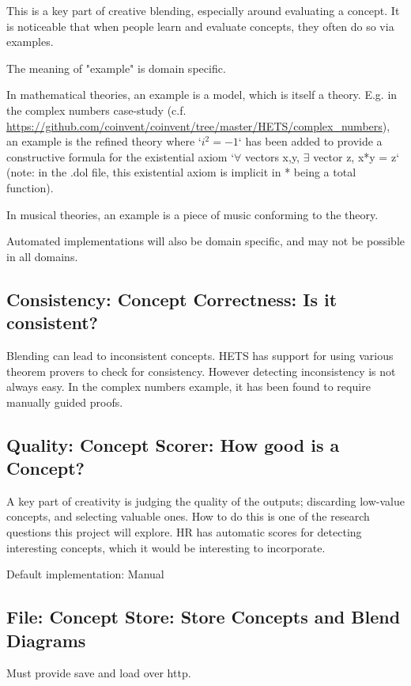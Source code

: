 \documentclass[10pt]{article}
\begin{document}
This is a key part of creative blending, especially around evaluating a concept. 
It is noticeable that when people learn and evaluate concepts, they often do so via examples.

The meaning of "example" is domain specific.

In mathematical theories, an example is a model, which is itself a theory. 
E.g. in the complex numbers case-study (c.f. \url{https://github.com/coinvent/coinvent/tree/master/HETS/complex_numbers}), 
an example is the refined theory where `$i^2 = -1$` has been added to provide a constructive formula for the existential
axiom `$\forall$ vectors x,y, $\exists$ vector z, x*y = z` (note: in the .dol file, this existential axiom is 
implicit in * being a total function).
 
In musical theories, an example is a piece of music conforming to the theory.
 
Automated implementations will also be domain specific, and may not be possible in all domains.

\subsection{Consistency: Concept Correctness: Is it consistent?}

Blending can lead to inconsistent concepts. HETS has support for using various theorem provers to check for consistency. However detecting inconsistency is not always
easy. In the complex numbers example, it has been found to require manually guided
proofs.

\subsection{Quality: Concept Scorer: How good is a Concept?}

A key part of creativity is judging the quality of the outputs; discarding
low-value concepts, and selecting valuable ones. How to do this is one of the research questions this project will explore. HR has automatic scores for detecting interesting concepts, which it would be interesting to incorporate.

Default implementation: Manual

\subsection{File: Concept Store: Store Concepts and Blend Diagrams}

Must provide save and load over http.
\end{document}
